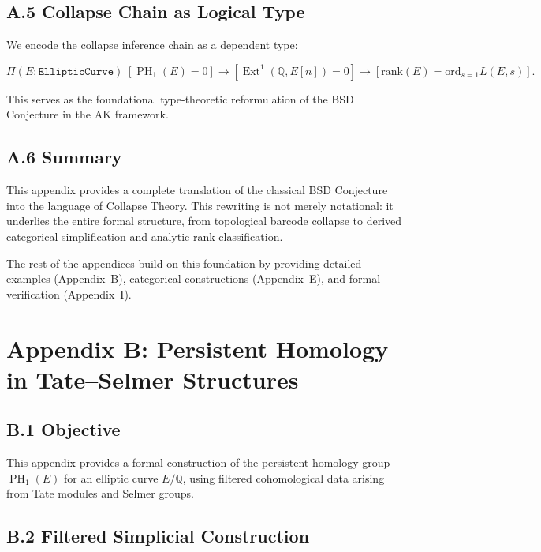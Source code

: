 \documentclass[11pt]{article}
\DeclareMathOperator{\Ext}{Ext}
\DeclareMathOperator{\PH}{PH}
\newcommand{\QQ}{\mathbb{Q}}
\begin{document}
\subsection*{A.5 Collapse Chain as Logical Type}

We encode the collapse inference chain as a dependent type:

\[
\Pi (E : \texttt{EllipticCurve})\; 
[\PH_1(E) = 0] \to [\Ext^1(\QQ,E[n]) = 0] \to [\mathrm{rank}(E) = \mathrm{ord}_{s=1} L(E,s)].
\]

This serves as the foundational type-theoretic reformulation of the BSD Conjecture in the AK framework.

\subsection*{A.6 Summary}

This appendix provides a complete translation of the classical BSD Conjecture into the language of Collapse Theory.  
This rewriting is not merely notational: it underlies the entire formal structure, from topological barcode collapse to derived categorical simplification and analytic rank classification.

The rest of the appendices build on this foundation by providing detailed examples (Appendix~B), categorical constructions (Appendix~E), and formal verification (Appendix~I).




\section*{Appendix B: Persistent Homology in Tate–Selmer Structures}

\subsection*{B.1 Objective}

This appendix provides a formal construction of the persistent homology group $\PH_1(E)$  
for an elliptic curve $E/\QQ$, using filtered cohomological data arising from Tate modules and Selmer groups.

\subsection*{B.2 Filtered Simplicial Construction}
\end{document}
